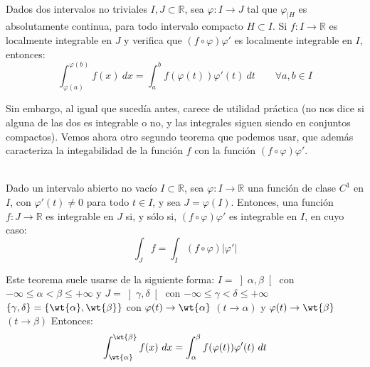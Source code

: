 \begin{teo}\ \\
    Dados dos intervalos no triviales $I,J\subset \mathbb{R}$, sea $\varphi:I\rightarrow J$ tal que $\varphi_{\big|H}$ es absolutamente continua, para todo intervalo compacto $H\subset I$.
    Si $f:I\rightarrow\mathbb{R}$ es localmente integrable en $J$ y verifica que $(f\circ \varphi)\varphi'$ es localmente integrable en $I$, entonces:
    \begin{equation*}
        \displaystyle\int_{\varphi(a)}^{\varphi(b)} f(x)~dx = \displaystyle\int_{a}^{b} f(\varphi(t))\varphi'(t)~dt\qquad \forall a,b\in I
    \end{equation*}
\end{teo}

Sin embargo, al igual que sucedía antes, carece de utilidad práctica (no nos dice si alguna de las dos es integrable o no, y las integrales siguen siendo en conjuntos compactos). Vemos ahora otro segundo teorema que podemos usar, que además caracteriza la integabilidad de la función $f$ con la función $(f\circ \varphi)\varphi'$. 

\begin{teo}\ \\
    Dado un intervalo abierto no vacío $I\subset \mathbb{R}$, sea $\varphi:I\rightarrow\mathbb{R}$ una función de clase $C^1$ en $I$, con $\varphi'(t)\neq 0$ para todo $t\in I$, y sea $J=\varphi(I)$.\newline
    Entonces, una función $f:J\rightarrow\mathbb{R}$ es integrable en $J$ si, y sólo si, $(f\circ \varphi)\varphi'$ es integrable en $I$, en cuyo caso:
    \begin{equation*}
        \int_J f = \int_I (f\circ\varphi)|\varphi'|
    \end{equation*}
\end{teo}

Este teorema suele usarse de la siguiente forma:\newline
$I=\left]\alpha,\beta\right[$ con $-\infty\leq \alpha<\beta\leq +\infty$ y $J=\left]\gamma,\delta\right[$ con $-\infty\leq \gamma<\delta\leq +\infty$\newline
$\{\gamma,\delta\} = \{\wt{\alpha},\wt{\beta}\}$ con $\varphi(t)\to\wt{\alpha}$ $(t\to\alpha)$ y $\varphi(t)\to\wt{\beta}$ $(t\to\beta)$\newline
Entonces:
\begin{equation*}
    \displaystyle\int_{\wt{\alpha}}^{\wt{\beta}} f(x)~dx = \displaystyle\int_{\alpha}^{\beta} f(\varphi(t))\varphi'(t)~dt 
\end{equation*}












